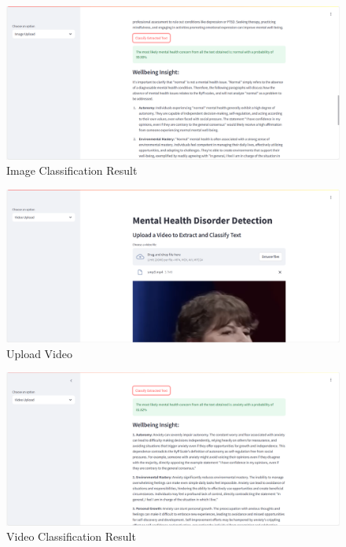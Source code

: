 \begin{figure}[h!]  
    \centering
    \includegraphics[width=1.0\textwidth]{App Images/05 Interface.png}  
    \caption{Image Classification Result}
    \label{05i}  %
\end{figure}

\pagebreak

\begin{figure}[h!]  
    \centering
    \includegraphics[width=1.0\textwidth]{App Images/12 Interface.png}  
    \caption{Upload Video}
    \label{06i4}  %
\end{figure}

\begin{figure}[h!]  
    \centering
    \includegraphics[width=1.0\textwidth]{App Images/13 Interface.png}  
    \caption{Video Classification Result}
    \label{06i}  %
\end{figure}


